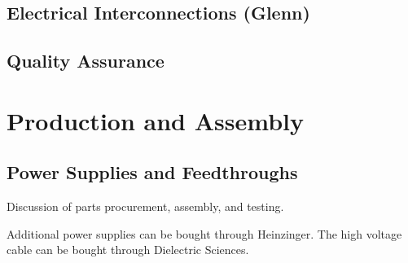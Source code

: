 



\subsection{Electrical Interconnections (Glenn)}


\subsection{Quality Assurance}
\label{sec:fdsp-hv-qa}



\section{Production and Assembly}
\label{sec:fdsp-hv-prod-assy}

\subsection{Power Supplies and Feedthroughs}
\label{sec:fdsp-hv-supplies-feedthroughs}

Discussion of parts procurement, assembly, and testing.

Additional power supplies can be bought through Heinzinger.   The high voltage cable can be bought through Dielectric Sciences.  


